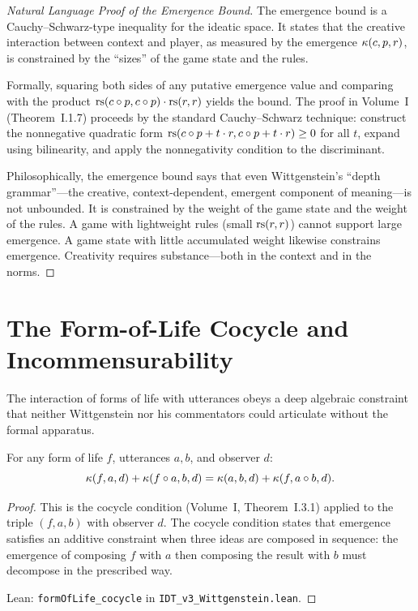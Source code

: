 \begin{proof}[Natural Language Proof of the Emergence Bound]
The emergence bound is a Cauchy--Schwarz-type inequality for the ideatic space.
It states that the creative interaction between context and player, as measured
by the emergence $\kappa(c, p, r)$, is constrained by the ``sizes'' of the
game state and the rules.

Formally, squaring both sides of any putative emergence value and comparing with
the product $\mathrm{rs}(c \circ p, c \circ p) \cdot \mathrm{rs}(r, r)$ yields the bound.
The proof in Volume~I (Theorem~I.1.7) proceeds by the standard Cauchy--Schwarz
technique: construct the nonnegative quadratic form
$\mathrm{rs}(c \circ p + t \cdot r, c \circ p + t \cdot r) \geq 0$ for all $t$,
expand using bilinearity, and apply the nonnegativity condition to the discriminant.

Philosophically, the emergence bound says that even Wittgenstein's ``depth
grammar''---the creative, context-dependent, emergent component of meaning---is
not unbounded. It is constrained by the weight of the game state and the weight
of the rules. A game with lightweight rules (small $\mathrm{rs}(r,r)$) cannot support
large emergence. A game state with little accumulated weight likewise constrains
emergence. Creativity requires substance---both in the context and in the norms.
\end{proof}

\section{The Form-of-Life Cocycle and Incommensurability}

The interaction of forms of life with utterances obeys a deep algebraic constraint
that neither Wittgenstein nor his commentators could articulate without the
formal apparatus.

\begin{theorem}
\label{thm:form-cocycle}
For any form of life $f$, utterances $a, b$, and observer $d$:
\[
\kappa(f, a, d) + \kappa(f \circ a, b, d)
= \kappa(a, b, d) + \kappa(f, a \circ b, d).
\]
\end{theorem}

\begin{proof}
This is the cocycle condition (Volume~I, Theorem~I.3.1) applied to the triple
$(f, a, b)$ with observer $d$. The cocycle condition states that emergence
satisfies an additive constraint when three ideas are composed in sequence:
the emergence of composing $f$ with $a$ then composing the result with $b$
must decompose in the prescribed way.

Lean: \texttt{formOfLife\_cocycle} in \texttt{IDT\_v3\_Wittgenstein.lean}.
\end{proof}

